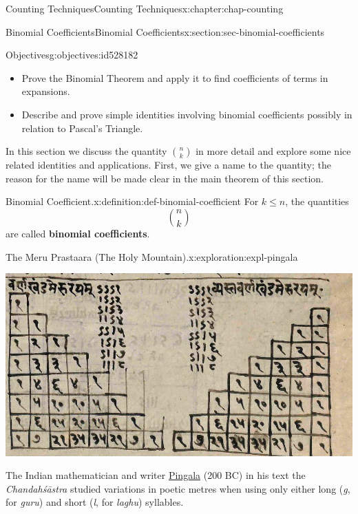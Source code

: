 \documentclass[oneside,10pt,]{book}
\newcommand{\terminology}[1]{\textbf{#1}}
\newcommand{\pubtitle}[1]{\textsl{#1}}
\numberwithin{equation}{section}
\begin{document}
\begin{chapterptx}{Counting Techniques}{}{Counting Techniques}{}{}{x:chapter:chap-counting}
%
\begin{sectionptx}{Binomial Coefficients}{}{Binomial Coefficients}{}{}{x:section:sec-binomial-coefficients}
\begin{objectives}{Objectives}{g:objectives:id528182}
%
\begin{itemize}[label=\textbullet]
\item{}Prove the Binomial Theorem and apply it to find coefficients of terms in expansions.%
\item{}Describe and prove simple identities involving binomial coefficients possibly in relation to Pascal's Triangle.%
\end{itemize}
\end{objectives}
In this section we discuss the quantity \(\displaystyle\binom{n}{k}\) in more detail and explore some nice related identities and applications. First, we give a name to the quantity; the reason for the name will be made clear in the main theorem of this section.%
\begin{definition}{Binomial Coefficient.}{x:definition:def-binomial-coefficient}%
For \(k \leq n\), the quantities%
\begin{equation*}
\binom{n}{k}
\end{equation*}
are called \terminology{binomial coefficients}.%
\end{definition}
\begin{exploration}{The Meru Prastaara (The Holy Mountain).}{x:exploration:expl-pingala}%
\begin{sidebyside}{1}{0.175}{0.175}{0}%
\begin{sbspanel}{0.65}%
\includegraphics[width=\linewidth]{figs/meru-prastaara.png}
\end{sbspanel}%
\end{sidebyside}%
\par
The Indian mathematician and writer \href{https://en.wikipedia.org/wiki/Pingala}{Pingala} (200 BC) in his text the \pubtitle{Chandahśāstra} studied variations in poetic metres when using only either long (\emph{g}, for \emph{guru}) and short (\emph{l}, for \emph{laghu}) syllables.%

\end{exploration}
\end{sectionptx}
\end{chapterptx}
\end{document}
